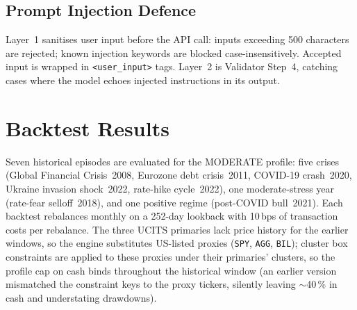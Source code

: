 \documentclass[11pt, a4paper]{article}
\begin{document}
\subsection{Prompt Injection Defence}
Layer~1 sanitises user input before the API call: inputs exceeding 500 characters are rejected; known injection keywords are blocked case-insensitively. Accepted input is wrapped in \texttt{<user\_input>} tags. Layer~2 is Validator Step~4, catching cases where the model echoes injected instructions in its output.

\section{Backtest Results}

Seven historical episodes are evaluated for the MODERATE profile: five crises (Global Financial Crisis~2008, Eurozone debt crisis~2011, COVID-19 crash~2020, Ukraine invasion shock~2022, rate-hike cycle~2022), one moderate-stress year (rate-fear selloff~2018), and one positive regime (post-COVID bull~2021). Each backtest rebalances monthly on a 252-day lookback with 10\,bps of transaction costs per rebalance. The three UCITS primaries lack price history for the earlier windows, so the engine substitutes US-listed proxies (\texttt{SPY}, \texttt{AGG}, \texttt{BIL}); cluster box constraints are applied to these proxies under their primaries' clusters, so the profile cap on cash binds throughout the historical window (an earlier version mismatched the constraint keys to the proxy tickers, silently leaving $\sim$40\,\% in cash and understating drawdowns).
\end{document}
